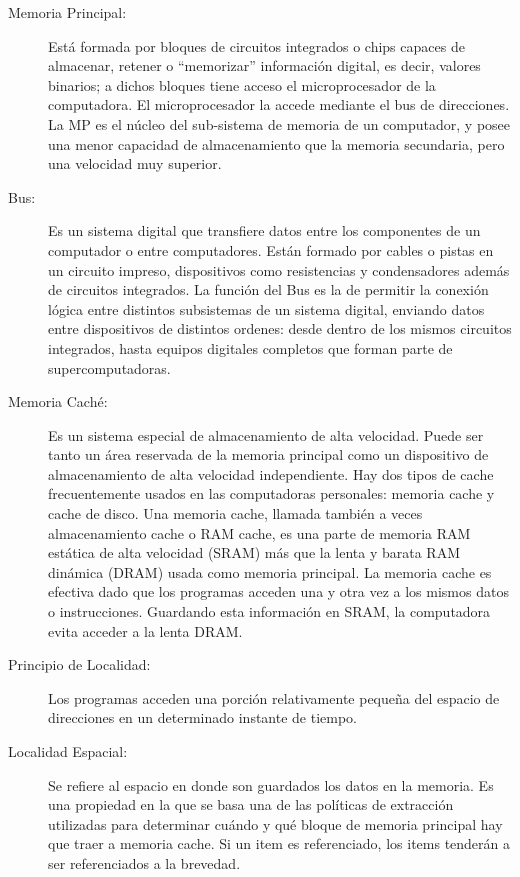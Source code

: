 \begin{description}
	\item[Memoria Principal:]
Está formada por bloques de circuitos integrados o chips capaces de almacenar, retener o ``memorizar''
información digital, es decir, valores binarios; a dichos bloques tiene acceso el microprocesador de la
computadora. El microprocesador la accede mediante el bus de direcciones. La MP es el núcleo del
sub-sistema de memoria de un computador, y posee una menor capacidad de almacenamiento que la memoria
secundaria, pero una velocidad muy superior.

	\item[Bus:]
Es un sistema digital que transfiere datos entre los componentes de un computador o
entre computadores. Están formado por cables o pistas en un circuito impreso, dispositivos como
resistencias y condensadores además de circuitos integrados. La función del Bus es la de permitir la
conexión lógica entre distintos subsistemas de un sistema digital, enviando datos entre dispositivos de
distintos ordenes: desde dentro de los mismos circuitos integrados, hasta equipos digitales completos que
forman parte de supercomputadoras.

	\item[Memoria Caché:]
Es un sistema especial de almacenamiento de alta velocidad. Puede ser tanto un área reservada de la
memoria principal como un dispositivo de almacenamiento de alta velocidad independiente. Hay dos tipos de
cache frecuentemente usados en las computadoras personales: memoria cache y cache de disco. Una memoria
cache, llamada también a veces almacenamiento cache o RAM cache, es una parte de memoria RAM estática de
alta velocidad (SRAM) más que la lenta y barata RAM dinámica (DRAM) usada como memoria principal. La
memoria cache es efectiva dado que los programas acceden una y otra vez a los mismos datos o
instrucciones. Guardando esta información en SRAM, la computadora evita acceder a la lenta DRAM.

	\item[Principio de Localidad:]
Los programas acceden una porción relativamente pequeña del
espacio de direcciones en un determinado instante de tiempo.

	\item[Localidad Espacial:]
Se refiere al espacio en donde son guardados los datos en la memoria. Es una propiedad en la que se basa
una de las políticas de extracción utilizadas para determinar cuándo y qué bloque de memoria principal
hay que traer a memoria cache. Si un item es referenciado, los items tenderán a ser referenciados a la
brevedad.


\end{description}
